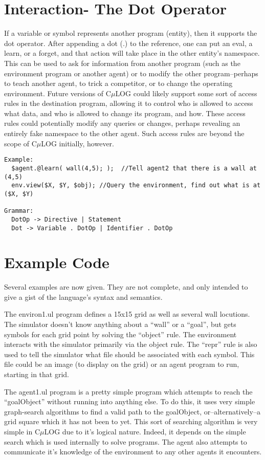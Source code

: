 \documentclass[onecolumn,titlepage]{article}
\begin{document}
\section{Interaction- The Dot Operator}
If a variable or symbol represents another program (entity), then it supports
the dot operator.  After appending a dot (.) to the reference, one can put
an eval, a learn, or a forget, and that action will take place in the other
entity's namespace.  This can be used to ask for information from another program
(such as the environment program or another agent) or to modify the other
program--perhaps to teach another agent, to trick a competitor, or to change
the operating environment.  Future versions of C$\mu$LOG could likely support
some sort of access rules in the destination program, allowing it to control who is
allowed to access what data, and who is allowed to change its program, and how.
These access rules could potentially modify any queries or changes, perhaps
revealing an entirely fake namespace to the other agent.  Such access rules are
beyond the scope of C$\mu$LOG initially, however.
\begin{verbatim}
Example:
  $agent.@learn( wall(4,5); );  //Tell agent2 that there is a wall at (4,5)
  env.view($X, $Y, $obj); //Query the environment, find out what is at ($X, $Y)

Grammar:
  DotOp -> Directive | Statement
  Dot -> Variable . DotOp | Identifier . DotOp
\end{verbatim}

\section{Example Code}
Several examples are now given.  They are not complete, and only intended
to give a gist of the language's syntax and semantics.

The environ1.ul program defines a 15x15 grid as well as several wall locutions.
The simulator doesn't know anything about a ``wall'' or a ``goal'', but gets
symbols for each grid point by solving the ``object'' rule.  The environment
interacts with the simulator primarily via the object rule.  The ``repr'' rule
is also used to tell the simulator what file should be associated with each
symbol.  This file could be an image (to display on the grid) or an agent program
to run, starting in that grid.

The agent1.ul program is a pretty simple program which attempts to reach the ``goalObject''
without running into anything else. To do this, it uses very simple graph-search 
algorithms to find a valid path to the goalObject, or--alternatively--a grid square
which it has not been to yet.  This sort of searching algorithm is very simple in
C$\mu$LOG due to it's logical nature.  Indeed, it depends on the simple search 
which is used internally to solve programs.  The agent also attempts to communicate it's 
knowledge of the environment to any other agents it encounters.
\end{document}
